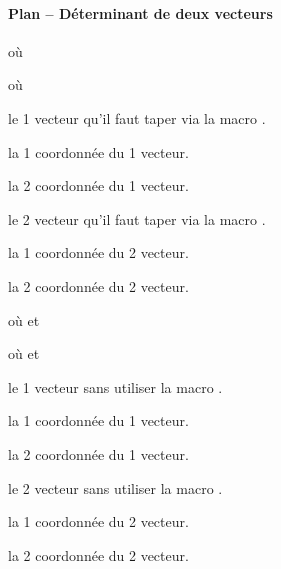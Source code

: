 \documentclass[12pt,a4paper]{article}
\begin{document}
\paragraph{Plan -- Déterminant de deux vecteurs}

  où \quad {}

 où \quad {}


 le 1\ier{} vecteur qu'il faut taper via la macro .

 la 1\iere{} coordonnée du 1\ier{} vecteur.

 la 2\ieme{} coordonnée du 1\ier{} vecteur.

 le 2\ieme{} vecteur qu'il faut taper via la macro .

 la 1\iere{} coordonnée du 2\ieme{} vecteur.

 la 2\ieme{} coordonnée du 2\ieme{} vecteur.


\separation


  où \quad {}
                                et 

 où \quad {}
                                et 


 le 1\ier{} vecteur sans utiliser la macro .

 la 1\iere{} coordonnée du 1\ier{} vecteur.

 la 2\ieme{} coordonnée du 1\ier{} vecteur.

 le 2\ieme{} vecteur sans utiliser la macro .

 la 1\iere{} coordonnée du 2\ieme{} vecteur.

 la 2\ieme{} coordonnée du 2\ieme{} vecteur.
\end{document}
